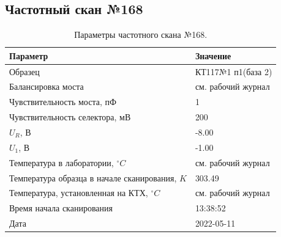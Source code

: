 \subsection{Частотный скан №168}
\begin{table}[!ht]
    \centering
    \caption{Параметры частотного скана №168.}
    \begin{tabular}{|l|l|}
        \hline
        Параметр                                       & Значение                  \\ \hline
        Образец                                        & КТ117№1 п1(база 2)        \\ \hline
        Балансировка моста                             & см. рабочий журнал        \\ \hline
        Чувствительность моста, пФ                     & 1                         \\ \hline
        Чувствительность селектора, мВ                 & 200                       \\ \hline
        $U_R$, В                                       & -8.00                     \\ \hline
        $U_1$, В                                       & -1.00                     \\ \hline
        Температура в лаборатории, $^\circ C$          & см. рабочий журнал        \\ \hline
        Температура образца в начале сканирования, $K$ & 303.49                    \\ \hline
        Температура, установленная на КТХ, $^\circ C$  & см. рабочий журнал        \\ \hline
        Время начала сканирования                      & 13:38:52                  \\ \hline
        Дата                                           & 2022-05-11                \\ \hline
    \end{tabular}
    \label{table:frequency_scan_168}
\end{table}

